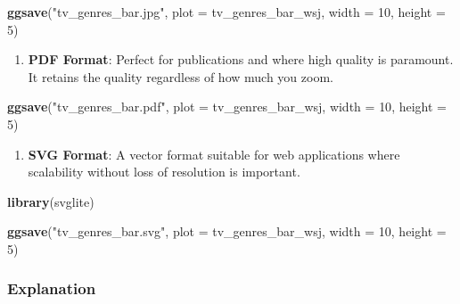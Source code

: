 \documentclass[
]{book}
\newenvironment{Shaded}{\begin{snugshade}}{\end{snugshade}}
\newcommand{\AttributeTok}[1]{\textcolor[rgb]{0.13,0.29,0.53}{#1}}
\newcommand{\DecValTok}[1]{\textcolor[rgb]{0.00,0.00,0.81}{#1}}
\newcommand{\FunctionTok}[1]{\textcolor[rgb]{0.13,0.29,0.53}{\textbf{#1}}}
\newcommand{\NormalTok}[1]{#1}
\newcommand{\StringTok}[1]{\textcolor[rgb]{0.31,0.60,0.02}{#1}}
\providecommand{\tightlist}{%
  \setlength{\itemsep}{0pt}\setlength{\parskip}{0pt}}
\begin{document}
\begin{Shaded}
\begin{Highlighting}[]
\FunctionTok{ggsave}\NormalTok{(}\StringTok{"tv\_genres\_bar.jpg"}\NormalTok{, }\AttributeTok{plot =}\NormalTok{ tv\_genres\_bar\_wsj, }\AttributeTok{width =} \DecValTok{10}\NormalTok{, }\AttributeTok{height =} \DecValTok{5}\NormalTok{)}
\end{Highlighting}
\end{Shaded}

\begin{enumerate}
\def\labelenumi{\arabic{enumi}.}
\setcounter{enumi}{2}
\tightlist
\item
  \textbf{PDF Format}: Perfect for publications and where high quality is paramount. It retains the quality regardless of how much you zoom.
\end{enumerate}

\begin{Shaded}
\begin{Highlighting}[]
\FunctionTok{ggsave}\NormalTok{(}\StringTok{"tv\_genres\_bar.pdf"}\NormalTok{, }\AttributeTok{plot =}\NormalTok{ tv\_genres\_bar\_wsj, }\AttributeTok{width =} \DecValTok{10}\NormalTok{, }\AttributeTok{height =} \DecValTok{5}\NormalTok{)}
\end{Highlighting}
\end{Shaded}

\begin{enumerate}
\def\labelenumi{\arabic{enumi}.}
\setcounter{enumi}{3}
\tightlist
\item
  \textbf{SVG Format}: A vector format suitable for web applications where scalability without loss of resolution is important.
\end{enumerate}

\begin{Shaded}
\begin{Highlighting}[]
\FunctionTok{library}\NormalTok{(svglite)}

\FunctionTok{ggsave}\NormalTok{(}\StringTok{"tv\_genres\_bar.svg"}\NormalTok{, }\AttributeTok{plot =}\NormalTok{ tv\_genres\_bar\_wsj, }\AttributeTok{width =} \DecValTok{10}\NormalTok{, }\AttributeTok{height =} \DecValTok{5}\NormalTok{)}
\end{Highlighting}
\end{Shaded}

\hypertarget{explanation}{%
\subsubsection*{Explanation}\label{explanation}}
\end{document}
